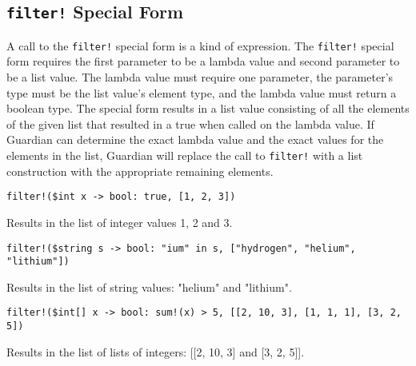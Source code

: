 
\subsection{\texttt{filter!} Special Form}
{
	A call to the \texttt{filter!} special form is a kind of expression.
	The \texttt{filter!} special form requires the first parameter to be
	a lambda value and second parameter to be a list value.
	The lambda value must require one parameter, the parameter's type must
	be the list value's element type, and the lambda value must return a
	boolean type.
	The special form results in a list value consisting of all the elements
	of the given list that resulted in a true when called on the lambda
	value.
	If Guardian can determine the exact lambda value and the exact
	values for the elements in the list, Guardian will replace the call
	to \texttt{filter!} with a list construction with the appropriate
	remaining elements.
	
	\begin{itemize}
	{
		\item \texttt{filter!(\$int x -> bool: true, [1, 2, 3])}
		
			Results in the list of integer values 1, 2 and 3.
		
		\item \texttt{filter!(\$string s -> bool: "ium" in s, ["hydrogen", "helium", "lithium"])}
		
			Results in the list of string values: "helium" and "lithium".
		
		\item \texttt{filter!(\$int[] x -> bool: sum!(x) > 5, [[2, 10, 3], [1, 1, 1], [3, 2, 5])}
			
			Results in the list of lists of integers: [[2, 10, 3] and [3, 2, 5]].
	}
	\end{itemize}
}
